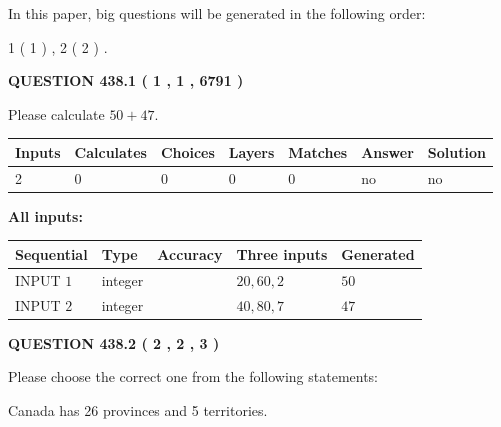 \documentclass[12pt]{article}
\begin{document}
In this paper, big questions will be generated in the following order: 
   
   
   1 ( 1 )
 ,
   2 ( 2 )
 .
  
\vspace{0.2in}
  
{\textbf{\Large{QUESTION
438.1 
 ( 1 , 1 , 6791 )
}}}
  
  
 
Please calculate $ %
50 +  %
47 $.
 
 
   
   
   
   
\noindent\begin{tabular}{|l|l|l|l|l|l|l|}
 \hline
Inputs & Calculates & Choices & Layers & Matches & Answer & Solution \\ \hline
 2  & 
 0  & 
 0
  & 
 0  & 
 0  & 
  no & 
  no 
  \\ \hline
 \end{tabular}
   
   
   
   
\noindent{}
   
   
   
   
\noindent\vspace{0.1in}\hspace{-0.08in} {\textbf{\Large{All inputs: }}}
   
   
  
  
\noindent\begin{tabular}{|l|l|l|l|l|}
\hline
 Sequential & Type & Accuracy & Three inputs & Generated \\ 
\hline
 
 
  INPUT $  1 $ & integer &  & $
 20
 , 
 60
 , 
 2
 $ & $ 50 $ 
 \\  \hline  
 
 
  INPUT $  2 $ & integer &  & $
 40
 , 
 80
 , 
 7
 $ & $ 47 $ 
 \\  \hline  
 \end{tabular}
   
   
  
\vspace{0.2in}
  
{\textbf{\Large{QUESTION
438.2 
 ( 2 , 2 , 3 )
}}}
  
  
Please choose the correct one from the following statements:
 
 
Canada has  26 provinces and  5 territories.
 
\end{document}
